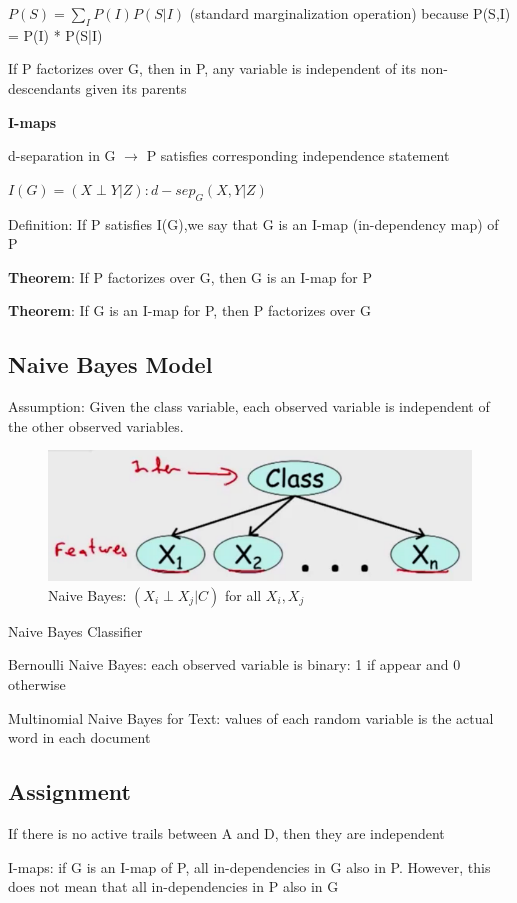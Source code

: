 \documentclass{book}
\begin{document}
$P(S) = \sum_{I}P(I)P(S|I)$ (standard marginalization operation) because P(S,I) = P(I) * P(S|I)

If P factorizes over G, then in P, any variable is independent of its non-descendants given its parents

\textbf{I-maps}

d-separation in G $\rightarrow$ P satisfies corresponding independence statement

$I(G) = {(X \perp Y | Z): d-sep_G(X,Y | Z)}$

Definition: If P satisfies I(G),we say that G is an I-map (in-dependency map) of P

\textbf{Theorem}: If P factorizes over G, then G is an I-map for P

\textbf{Theorem}: If G is an I-map for P, then P factorizes over G


\subsection{Naive Bayes Model}

Assumption: Given the class variable, each observed variable is independent of the other observed variables.
\begin{figure}[h]
\centering
\includegraphics[width=0.7\linewidth, height=0.1\textheight]{./figures/naivebayes}
\caption{Naive Bayes: $(X_i \perp X_j | C)$ for all $X_i,X_j$}
\label{fig:naivebayes}
\end{figure}

Naive Bayes Classifier

Bernoulli Naive Bayes: each observed variable is binary: 1 if appear and 0 otherwise

Multinomial Naive Bayes for Text: values of each random variable is the actual word in each document



\subsection{Assignment}

If there is no active trails between A and D, then they are independent

I-maps: if G is an I-map of P, all in-dependencies in G also in P. However, this does not mean that all in-dependencies in P also in G
\end{document}
